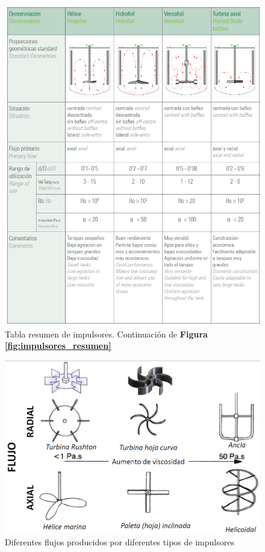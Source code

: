             \begin{figure}
                \centering
                \includegraphics[width=\textwidth]{img/esquemas/resumen_impulsores.png}
                \caption[Tabla resumen de impulsores (continuación)]{Tabla resumen de impulsores. Continuación de \textbf{Figura \ref{fig:impulsores_resumen}}}
                \label{fig:impulsores_resumen_cont}
            \end{figure}
            
            \begin{figure}
                \centering
                \includegraphics[width=.9\textwidth]{img/esquemas/Impulsores.png}
                \caption{Diferentes flujos producidos por diferentes tipos de impulsores}
                \label{fig:impulsores}
            \end{figure}
            
